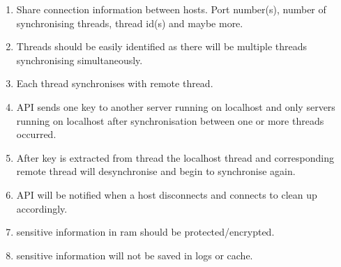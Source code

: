 \begin{enumerate}

	\item Share connection information between hosts. Port number(s), number of synchronising threads, thread id(s) and maybe more.
	\item Threads should be easily identified as there will be multiple threads synchronising simultaneously. 
	\item Each thread synchronises with remote thread.
	\item API sends one key to another server running on localhost and only servers running on localhost after synchronisation between one or more threads occurred.
	\item After key is extracted from thread the localhost thread and corresponding remote thread will desynchronise and begin to synchronise again.
	\item API will be notified when a host disconnects and connects to clean up accordingly.
	\item sensitive information in ram should be protected/encrypted.
	\item sensitive information will not be saved in logs or cache.
	
\end{enumerate}




